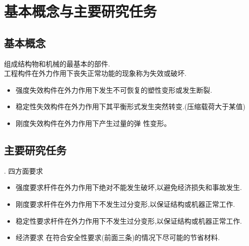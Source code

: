 \section{基本概念与主要研究任务}
\subsection{基本概念}
\vspace{1em}
组成结构物和机械的最基本的部件.\\[0.5em]
工程构件在外力作用下丧失正常功能的现象称为失效或破坏.
\begin{itemize}
	\item 强度失效\quad 构件在外力作用下发生不可恢复的塑性变形或发生断裂.
	\item 稳定性失效\quad 构件在外力作用下其平衡形式发生突然转变.(压缩载荷大于某值)
	\item 刚度失效\quad 构件在外力作用下产生过量的弹
	性变形。
	
\end{itemize}

\subsection{主要研究任务}
\vspace{1em}
. 四方面要求
\begin{itemize}
	\item 强度要求\quad 杆件在外力作用下绝对不能发生破坏,以避免经济损失和事故发生.\\
	\empha[在外力作用下构件抵抗破坏的能力.]
	\item 刚度要求\quad 杆件在外力作用下不发生过分变形,以保证结构或机器正常工作.\\
	\empha[在外力作用下构件抵抗变形的能力.]
	\item 稳定性要求\quad 杆件在外力作用下不发生过分变形,以保证结构或机器正常工作.\\
	\empha[在外力作用下保持其原有的平衡状态的能力.]
	\item 经济要求 \quad 在符合安全性要求(前面三条)的情况下尽可能的节省材料.
\end{itemize}

